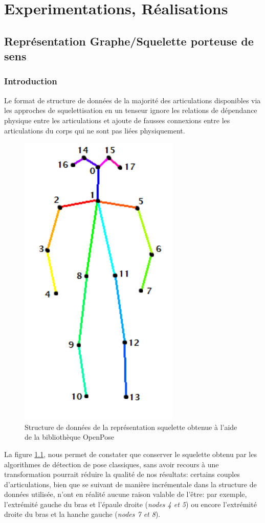 \clearpage
\chapter{Experimentations, Réalisations}
\label{sec:exp}

\section{Représentation Graphe/Squelette porteuse de sens}
\label{dfs}
\subsection{Introduction}
Le format de structure de données de la majorité des articulations disponibles via les approches de squelettisation en un tenseur ignore les relations de dépendance physique entre les articulations et ajoute de fausses connexions entre les articulations du corps qui ne sont pas liées physiquement.

\begin{figure}[H]
    \centering
    \includegraphics[width=0.3\linewidth]{Images/openpose.png}
    \caption{Structure de données de la représentation squelette obtenue à l'aide de la bibliothèque OpenPose \cite{cao2017realtime}}
    \label{fig:openPoseSkel}
\end{figure}

La figure \ref{fig:openPoseSkel}, nous permet de constater que conserver le squelette obtenu par les algorithmes de détection de pose classiques, sans avoir recours à une transformation pourrait réduire la qualité de nos résultats: certains couples d'articulations, bien que se suivant de manière incrémentale dans la structure de données utilisée, n'ont en réalité aucune raison valable de l'être: par exemple, l'extrémité gauche du bras et l'épaule droite (\textit{nodes 4 et 5}) ou encore l'extrémité droite du bras et la hanche gauche (\textit{nodes 7 et 8}).

